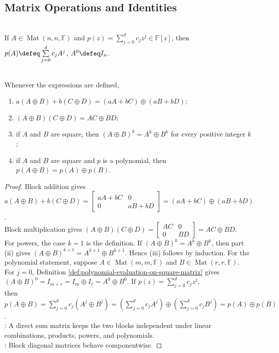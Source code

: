 \subsection{Matrix Operations and Identities}

\begin{definition} \label{def:polynomial-evaluation-on-square-matrix} \\
If $A\in\operatorname{Mat}(n,n,\mathbb{F})$ and $p(z)=\sum\limits_{j=0}^d c_jz^j\in\mathbb{F}[z]$, then $p(A)\defeq\sum\limits_{j=0}^d c_jA^j$, $A^0\defeq I_n$.
\end{definition}

\begin{proposition} \label{prop:direct-sum-matrix-algebra} \\
Whenever the expressions are defined,
\begin{enumerate}[label=(\roman*)]
\setlength{\itemsep}{0pt}
\item $a(A\oplus B)+b(C\oplus D)=(aA+bC)\oplus(aB+bD)$;
\item $(A\oplus B)(C\oplus D)=AC\oplus BD$;
\item if $A$ and $B$ are square, then $(A\oplus B)^k=A^k\oplus B^k$ for every positive integer $k$;
\item if $A$ and $B$ are square and $p$ is a polynomial, then $p(A\oplus B)=p(A)\oplus p(B)$.
\end{enumerate}
\begin{proof}
Block addition gives $a(A\oplus B)+b(C\oplus D)
=
\begin{bmatrix}
aA+bC&0\\
0&aB+bD
\end{bmatrix}
=(aA+bC)\oplus(aB+bD)$.\\
Block multiplication gives $(A\oplus B)(C\oplus D)
=
\begin{bmatrix}
AC&0\\
0&BD
\end{bmatrix}
=AC\oplus BD$.\\
For powers, the case $k=1$ is the definition. If $(A\oplus B)^k=A^k\oplus B^k$, then part (ii) gives $(A\oplus B)^{k+1}=A^{k+1}\oplus B^{k+1}$. Hence (iii) follows by induction. For the polynomial statement, suppose $A\in\operatorname{Mat}(m,m,\mathbb{F})$ and $B\in\operatorname{Mat}(r,r,\mathbb{F})$. For $j=0$, Definition \ref{def:polynomial-evaluation-on-square-matrix} gives $(A\oplus B)^0=I_{m+r}=I_m\oplus I_r=A^0\oplus B^0$. If $p(z)=\sum_{j=0}^{d}c_jz^j$,\\
then $p(A\oplus B)=\sum\limits_{j=0}^{d}c_j(A^j\oplus B^j) =\left(\sum\limits_{j=0}^{d}c_jA^j\right)\oplus\left(\sum\limits_{j=0}^{d}c_jB^j\right) =p(A)\oplus p(B)$.\\
: A direct sum matrix keeps the two blocks independent under linear combinations, products, powers, and polynomials.\\
: Block diagonal matrices behave componentwise.
\end{proof}
\end{proposition}

